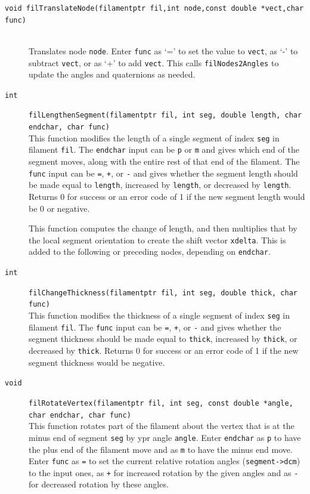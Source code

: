 \documentclass {scrbook}
\newcommand {\ttt} {\texttt}
\begin{document}
\begin{description}
\item[\ttt{void filTranslateNode(filamentptr fil,int node,const double *vect,char func)}]
\hfill \\
Translates node \ttt{node}. Enter \ttt{func} as `=' to set the value to \ttt{vect}, as `-' to subtract \ttt{vect}, or as `+' to add \ttt{vect}. This calls \ttt{filNodes2Angles} to update the angles and quaternions as needed.

\item[\ttt{int}]
\ttt{filLengthenSegment(filamentptr fil, int seg, double length, char endchar, char func)}
\hfill \\
This function modifies the length of a single segment of index \ttt{seg} in filament \ttt{fil}. The \ttt{endchar} input can be \ttt{p} or \ttt{m} and gives which end of the segment moves, along with the entire rest of that end of the filament. The \ttt{func} input can be \ttt{=}, \ttt{+}, or \ttt{-} and gives whether the segment length should be made equal to \ttt{length}, increased by \ttt{length}, or decreased by \ttt{length}. Returns 0 for success or an error code of 1 if the new segment length would be 0 or negative.

This function computes the change of length, and then multiplies that by the local segment orientation to create the shift vector \ttt{xdelta}. This is added to the following or preceding nodes, depending on \ttt{endchar}.

\item[\ttt{int}]
\ttt{filChangeThickness(filamentptr fil, int seg, double thick, char func)}
\hfill \\
This function modifies the thickness of a single segment of index \ttt{seg} in filament \ttt{fil}. The \ttt{func} input can be \ttt{=}, \ttt{+}, or \ttt{-} and gives whether the segment thickness should be made equal to \ttt{thick}, increased by \ttt{thick}, or decreased by \ttt{thick}. Returns 0 for success or an error code of 1 if the new segment thickness would be negative.

\item[\ttt{void}]
\ttt{filRotateVertex(filamentptr fil, int seg, const double *angle, char endchar, char func)}
\hfill \\
This function rotates part of the filament about the vertex that is at the minus end of segment \ttt{seg} by ypr angle \ttt{angle}. Enter \ttt{endchar} as \ttt{p} to have the plus end of the filament move and as \ttt{m} to have the minus end move. Enter \ttt{func} as \ttt{=} to set the current relative rotation angles (\ttt{segment->dcm}) to the input ones, as \ttt{+} for increased rotation by the given angles and as \ttt{-} for decreased rotation by these angles.


\end{description}
\end{document}
